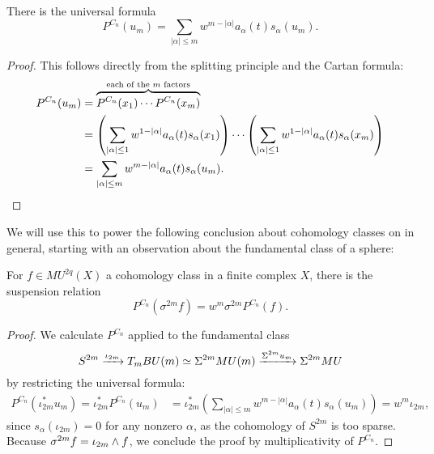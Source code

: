 \begin{corollary}
There is the universal formula \[P^{C_n}(u_m) = \sum_{|\alpha| \le m} w^{m - |\alpha|} a_\alpha(t) s_\alpha(u_m).\]
\end{corollary}
\begin{proof}
This follows directly from the splitting principle and the Cartan formula:
\begin{align*}
P^{C_n}(u_m) & = \overset{\text{each of the \(m\) factors}}{\overbrace{P^{C_n}(x_1) \cdots P^{C_n}(x_m)}} \\
& = \left(\sum_{|\alpha| \le 1} w^{1 - |\alpha|} a_\alpha(t) s_\alpha(x_1)\right) \cdots \left( \sum_{|\alpha| \le 1} w^{1 - |\alpha|} a_\alpha(t) s_\alpha(x_m) \right) \\
& = \sum_{|\alpha| \le m} w^{m - |\alpha|} a_\alpha(t) s_\alpha(u_m). \qedhere
\end{align*}
\end{proof}

We will use this to power the following conclusion about cohomology classes on in general, starting with an observation about the fundamental class of a sphere:

\begin{lemma}\label{PowerOpnsOnSuspensions}
For \(f \in MU^{2q}(X)\) a cohomology class in a finite complex \(X\), there is the suspension relation \[P^{C_n}(\sigma^{2m} f) = w^m \sigma^{2m} P^{C_n}(f).\]
\end{lemma}
\begin{proof}
We calculate \(P^{C_n}\) applied to the fundamental class \[S^{2m} \xrightarrow{\iota_{2m}} T_m BU(m) \simeq \Sigma^{2m} MU(m) \xrightarrow{\Sigma^{2m} u_m} \Sigma^{2m} MU\] by restricting the universal formula:
\begin{align*}
P^{C_n}(\iota_{2m}^* u_m) = \iota_{2m}^* P^{C_n}(u_m) & = \iota_{2m}^* \left( \sum_{|\alpha| \le m} w^{m - |\alpha|} a_\alpha(t) s_\alpha(u_m) \right) = w^m \iota_{2m},
\end{align*}
since \(s_\alpha(\iota_{2m}) = 0\) for any nonzero \(\alpha\), as the cohomology of \(S^{2m}\) is too sparse.  Because \(\sigma^{2m} f = \iota_{2m} \wedge f\), we conclude the proof by multiplicativity of \(P^{C_n}\).
\end{proof}


